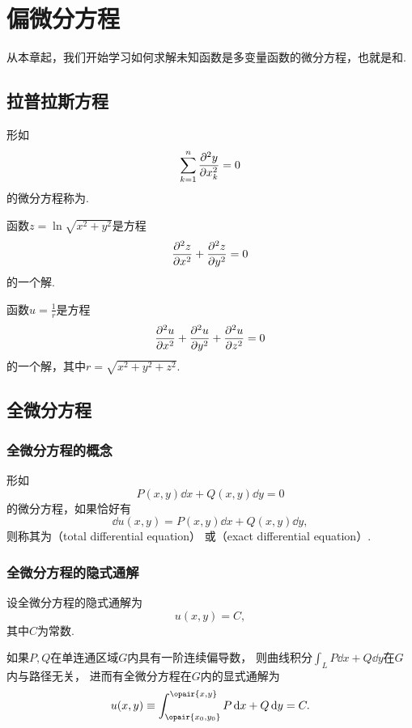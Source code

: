 \chapter{偏微分方程}
从本章起，我们开始学习如何求解未知函数是多变量函数的微分方程，也就是和.

\section{拉普拉斯方程}
\begin{definition}
形如\[
\sum\limits_{k=1}^{n} \pdv[2]{y}{x_k} = 0
\]的微分方程称为.
\end{definition}

\begin{example}
函数\(z=\ln\sqrt{x^2+y^2}\)是方程\[
\pdv[2]{z}{x} + \pdv[2]{z}{y} = 0
\]的一个解.
\end{example}

\begin{example}
函数\(u=\frac{1}{r}\)是方程\[
\pdv[2]{u}{x} + \pdv[2]{u}{y} + \pdv[2]{u}{z} = 0
\]的一个解，其中\(r=\sqrt{x^2+y^2+z^2}\).
\end{example}

\section{全微分方程}
\subsection{全微分方程的概念}
\begin{definition}
形如\[
P(x,y)\dd{x} + Q(x,y)\dd{y} = 0
\]的微分方程，如果恰好有\[
\dd{u(x,y)} = P(x,y)\dd{x} + Q(x,y)\dd{y},
\]则称其为（total differential equation）%
或（exact differential equation）.
\end{definition}

\subsection{全微分方程的隐式通解}
设全微分方程的隐式通解为\[
u(x,y) = C,
\]其中\(C\)为常数.

如果\(P,Q\)在单连通区域\(G\)内具有一阶连续偏导数，%
则曲线积分\(\int_L P\dd{x}+Q\dd{y}\)在\(G\)内与路径无关，%
进而有全微分方程在\(G\)内的显式通解为\[
u(x,y) \equiv \int_{\opair{x_0,y_0}}^{\opair{x,y}} P\dd{x}+Q\dd{y} = C.
\]

